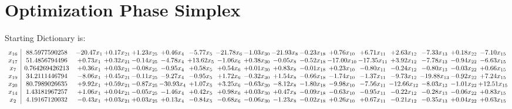 \documentclass[9pt]{article}
\begin{document}
\section{Optimization Phase Simplex}
Starting Dictionary is:
\[\begin{array}{c| c c@{\hskip 2pt} c@{\hskip 2pt} c@{\hskip 2pt} c@{\hskip 2pt} c@{\hskip 2pt} c@{\hskip 2pt} c@{\hskip 2pt} c@{\hskip 2pt} c@{\hskip 2pt} c@{\hskip 2pt} c@{\hskip 2pt} c@{\hskip 2pt} c@{\hskip 2pt} c@{\hskip 2pt} c@{\hskip 2pt} }
 x_{16}   &  88.5977590258 & -20.47 x_{1} & +  0.17 x_{21} & +  1.23 x_{25} & +  0.46 x_{4} & -5.77 x_{5} & -21.78 x_{6} & -1.03 x_{30} & -21.93 x_{8} & -0.23 x_{18} & +  0.76 x_{10} & +  6.71 x_{11} & +  2.63 x_{12} & -7.33 x_{13} & +  0.18 x_{22} & -7.10 x_{15}\\
 x_{17}   &  51.4856794496 & +  0.73 x_{1} & +  0.32 x_{21} & -0.14 x_{25} & -4.78 x_{4} & + 13.62 x_{5} & -1.06 x_{6} & +  0.38 x_{30} & -0.05 x_{8} & -0.52 x_{18} & -17.00 x_{10} & -17.35 x_{11} & +  3.92 x_{12} & -7.78 x_{13} & -0.94 x_{22} & -6.63 x_{15}\\
 x_{7}   &  0.764269426213 & +  0.36 x_{1} & +  0.03 x_{21} & -0.08 x_{25} & -0.95 x_{4} & +  0.58 x_{5} & +  0.54 x_{6} & +  0.01 x_{30} & +  0.83 x_{8} & -0.01 x_{18} & +  0.23 x_{10} & -0.80 x_{11} & -0.24 x_{12} & -0.80 x_{13} & -0.03 x_{22} & +  0.66 x_{15}\\
 x_{19}   &  34.2111446794 & -8.06 x_{1} & +  0.45 x_{21} & -0.11 x_{25} & -9.27 x_{4} & -0.95 x_{5} & +  1.72 x_{6} & -0.32 x_{30} & +  1.54 x_{8} & -0.66 x_{18} & -1.74 x_{10} & -1.37 x_{11} & -9.73 x_{12} & -19.88 x_{13} & -0.92 x_{22} & +  7.24 x_{15}\\
 x_{20}   &  80.7989026635 & +  9.92 x_{1} & +  0.59 x_{21} & -0.87 x_{25} & -30.93 x_{4} & +  1.07 x_{5} & +  3.25 x_{6} & -0.63 x_{30} & -8.12 x_{8} & -1.80 x_{18} & -9.98 x_{10} & -7.56 x_{11} & -12.66 x_{12} & -8.03 x_{13} & -1.01 x_{22} & + 12.51 x_{15}\\
 x_{14}   &  1.43181967257 & +  1.06 x_{1} & +  0.04 x_{21} & -0.05 x_{25} & -1.46 x_{4} & +  0.42 x_{5} & +  0.98 x_{6} & +  0.03 x_{30} & +  0.47 x_{8} & -0.09 x_{18} & -0.63 x_{10} & -0.95 x_{11} & -0.22 x_{12} & -0.28 x_{13} & -0.06 x_{22} & +  0.83 x_{15}\\
 x_{2}   &  4.19167120032 & -0.43 x_{1} & +  0.03 x_{21} & +  0.03 x_{25} & +  0.13 x_{4} & -0.84 x_{5} & -0.68 x_{6} & -0.06 x_{30} & -1.23 x_{8} & -0.02 x_{18} & +  0.26 x_{10} & +  0.67 x_{11} & -0.21 x_{12} & -0.35 x_{13} & +  0.04 x_{22} & +  0.63 x_{15}\\

\end{array}\]
\end{document}
